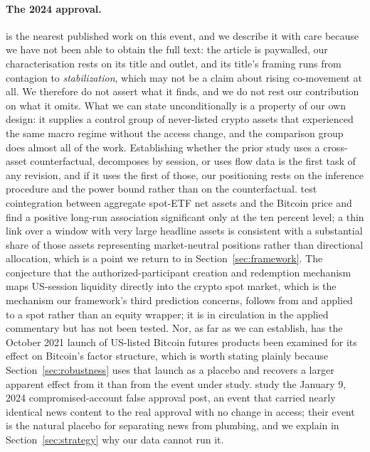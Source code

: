 \documentclass[12pt,a4paper]{article}
\begin{document}
\paragraph{The 2024 approval.} \citet{khatib2026from} is the nearest published work on this event, and we describe it with care because we have not been able to obtain the full text: the article is paywalled, our characterisation rests on its title and outlet, and its title's framing runs from contagion to \emph{stabilization}, which may not be a claim about rising co-movement at all. We therefore do not assert what it finds, and we do not rest our contribution on what it omits. What we can state unconditionally is a property of our own design: it supplies a control group of never-listed crypto assets that experienced the same macro regime without the access change, and the comparison group does almost all of the work. Establishing whether the prior study uses a cross-asset counterfactual, decomposes by session, or uses flow data is the first task of any revision, and if it uses the first of those, our positioning rests on the inference procedure and the power bound rather than on the counterfactual. \citet{guliyev2025from} test cointegration between aggregate spot-ETF net assets and the Bitcoin price and find a positive long-run association significant only at the ten percent level; a thin link over a window with very large headline assets is consistent with a substantial share of those assets representing market-neutral positions rather than directional allocation, which is a point we return to in Section~\ref{sec:framework}. The conjecture that the authorized-participant creation and redemption mechanism maps US-session liquidity directly into the crypto spot market, which is the mechanism our framework's third prediction concerns, follows from \citet{da2017exchange} and \citet{bendavid2014do} applied to a spot rather than an equity wrapper; it is in circulation in the applied commentary \citep{tang2026the} but has not been tested. Nor, as far as we can establish, has the October 2021 launch of US-listed Bitcoin futures products been examined for its effect on Bitcoin's factor structure, which is worth stating plainly because Section~\ref{sec:robustness} uses that launch as a placebo and recovers a larger apparent effect from it than from the event under study. \citet{pucher2026falsenews} study the January 9, 2024 compromised-account false approval post, an event that carried nearly identical news content to the real approval with no change in access; their event is the natural placebo for separating news from plumbing, and we explain in Section~\ref{sec:strategy} why our data cannot run it.
\end{document}
